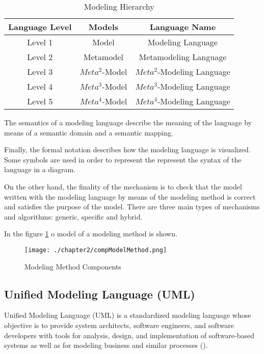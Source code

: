 \begin{table}[h!]
\centering
	\begin{tabular}{||c|c|c||} 
	\hline\hline
	Language Level & Models & Language Name \\ [1ex] 
	\hline\hline
	Level 1 & Model & Modeling Language  \\
	\hline
	Level 2 & Metamodel & Metamodeling Language  \\
	\hline
	Level 3 & $Meta^2$-Model & $Meta^2$-Modeling Language  \\
	\hline
	Level 4 & $Meta^3$-Model & $Meta^3$-Modeling Language  \\
	\hline
	Level 5 & $Meta^4$-Model & $Meta^4$-Modeling Language  \\
	\hline\hline
	\end{tabular}
\caption{Modeling Hierarchy}
\label{Modeling Hierarchy}
\end{table}

The semantics of a modeling language describe the meaning of the language by means of a semantic domain and a semantic mapping.

Finally, the formal notation describes how the modeling language is visualized. Some symbols are used in order to represent the represent the syntax of the language in a diagram.

On the other hand, the finality of the mechanism is to check that the model written with the modeling language by means of the modeling method is correct and satisfies the purpose of the model. There are three main types of mechanisms and algorithms: generic, specific and hybrid.

In the figure \ref{fig:Modeling Method Components} o model of a modeling method is shown.

\begin{figure}
\centering
{\texttt{[image: ./chapter2/compModelMethod.png]}}
\caption{Modeling Method Components}
\label{fig:Modeling Method Components}
\end{figure}

\subsection{Unified Modeling Language (UML)}

Unified Modeling Language (UML) is a standardized modeling language whose objective is to provide system architects, software engineers, and software developers with tools for analysis, design, and implementation of software-based systems as well as for modeling business and similar processes (\cite{umlwebsite}).

